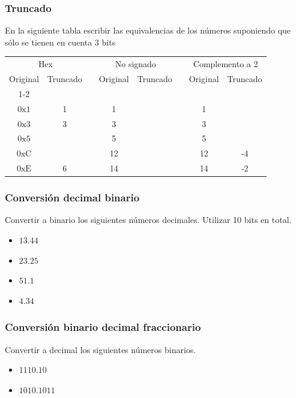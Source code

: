 \begin{ejercicioClase}

    \subsubsection{Truncado}
    En la siguiente tabla escribir las equivalencias de los números suponiendo que sólo se tienen en cuenta 3 bits\\

    \begin{tabular}{cccccccc}
      \multicolumn{2}{c}{Hex} & &\multicolumn{2}{c}{No signado}& &\multicolumn{2}{c}{Complemento a 2}\\
      Original&Truncado&&Original&Truncado&&Original&Truncado\\
      \cline{1-2}\cline{4-5}\cline{7-8}\\
      $\mathrm{0x1}$&1          &&1  &\underspace&&1 & \underspace \\
      $\mathrm{0x3}$&3          &&3  &\underspace&&3 & \underspace \\
      $\mathrm{0x5}$&\underspace&&5  &\underspace&&5 & \underspace \\
      $\mathrm{0xC}$&\underspace&&12 &\underspace&&12& -4\\
      $\mathrm{0xE}$&6          &&14 &\underspace&&14& -2\\
    \end{tabular}

    \subsubsection{Conversión decimal binario}
    Convertir a binario los siguientes números decimales. Utilizar 10 bits en total.
    \begin{itemize}
      \item $13.44$
      \item $23.25$
      \item $51.1$
      \item $4.34$
    \end{itemize}
    
    \subsubsection{Conversión binario decimal fraccionario}
    Convertir a decimal los siguientes números binarios.
    \begin{itemize}
      \item $\mathrm{1110.10}$
      \item $\mathrm{1010.1011}$
    \end{itemize}


\end{ejercicioClase}
